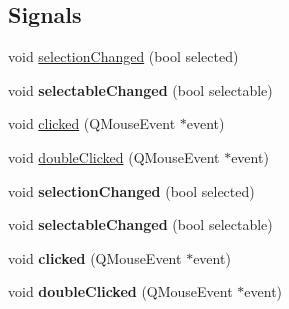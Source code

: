 \subsection*{Signals}
\begin{DoxyCompactItemize}
\item 
void \hyperlink{class_q_c_p_text_element_a49f45b87ee9c1fe866c2cdd12af17a9a}{selection\+Changed} (bool selected)
\item 
void {\bfseries selectable\+Changed} (bool selectable)\hypertarget{class_q_c_p_text_element_ac4567260b52d02bfbad63357d13986c5}{}\label{class_q_c_p_text_element_ac4567260b52d02bfbad63357d13986c5}

\item 
void \hyperlink{class_q_c_p_text_element_ad2246a0e701c0655623f048737298334}{clicked} (Q\+Mouse\+Event $\ast$event)
\item 
void \hyperlink{class_q_c_p_text_element_a9c6fd27ae8a7c3a02df7a6bbd3509e40}{double\+Clicked} (Q\+Mouse\+Event $\ast$event)
\item 
void {\bfseries selection\+Changed} (bool selected)\hypertarget{class_q_c_p_text_element_a49f45b87ee9c1fe866c2cdd12af17a9a}{}\label{class_q_c_p_text_element_a49f45b87ee9c1fe866c2cdd12af17a9a}

\item 
void {\bfseries selectable\+Changed} (bool selectable)\hypertarget{class_q_c_p_text_element_ac4567260b52d02bfbad63357d13986c5}{}\label{class_q_c_p_text_element_ac4567260b52d02bfbad63357d13986c5}

\item 
void {\bfseries clicked} (Q\+Mouse\+Event $\ast$event)\hypertarget{class_q_c_p_text_element_ad2246a0e701c0655623f048737298334}{}\label{class_q_c_p_text_element_ad2246a0e701c0655623f048737298334}

\item 
void {\bfseries double\+Clicked} (Q\+Mouse\+Event $\ast$event)\hypertarget{class_q_c_p_text_element_a9c6fd27ae8a7c3a02df7a6bbd3509e40}{}\label{class_q_c_p_text_element_a9c6fd27ae8a7c3a02df7a6bbd3509e40}

\end{DoxyCompactItemize}
